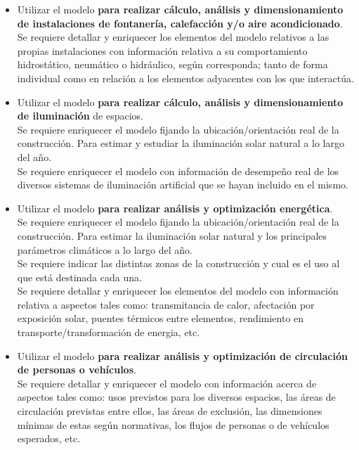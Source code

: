 \documentclass[spanish,12pt,a4paper,final,oneside]{book}
\begin{document}
\begin{itemize}
\item Utilizar el modelo \textbf{para realizar cálculo, análisis y dimensionamiento de instalaciones de fontanería, calefacción y/o aire acondicionado}.
\\Se requiere detallar y enriquecer los elementos del modelo relativos a las propias instalaciones con información relativa a su comportamiento hidrostático, neumático o hidráulico, según corresponda; tanto de forma individual como en relación a los elementos adyacentes con los que interactúa.

\item Utilizar el modelo \textbf{para realizar cálculo, análisis y dimensionamiento de iluminación} de espacios.
\\Se requiere enriquecer el modelo fijando la ubicación/orientación real de la construcción. Para estimar y estudiar la iluminación solar natural a lo largo del año.
\\Se requiere enriquecer el modelo con información de desempeño real de los diversos sistemas de iluminación artificial que se hayan incluido en el mismo.

\item Utilizar el modelo \textbf{para realizar análisis y optimización energética}.
\\Se requiere enriquecer el modelo fijando la ubicación/orientación real de la construcción. Para estimar la iluminación solar natural y los principales parámetros climáticos a lo largo del año.
\\Se requiere indicar las distintas zonas de la construcción y cual es el uso al que está destinada cada una.
\\Se requiere detallar y enriquecer los elementos del modelo con información relativa a aspectos tales como: transmitancia de calor, afectación por exposición solar, puentes térmicos entre elementos, rendimiento en transporte/transformación de energia, etc.

\item Utilizar el modelo \textbf{para realizar análisis y optimización de circulación de personas o vehículos}.
\\Se requiere detallar y enriquecer el modelo con información acerca de aspectos tales como: usos previstos para los diversos espacios, las áreas de circulación previstas entre ellos, las áreas de exclusión, las dimensiones mínimas de estas según normativas, los flujos de personas o de vehículos esperados, etc.


\end{itemize}
\end{document}
